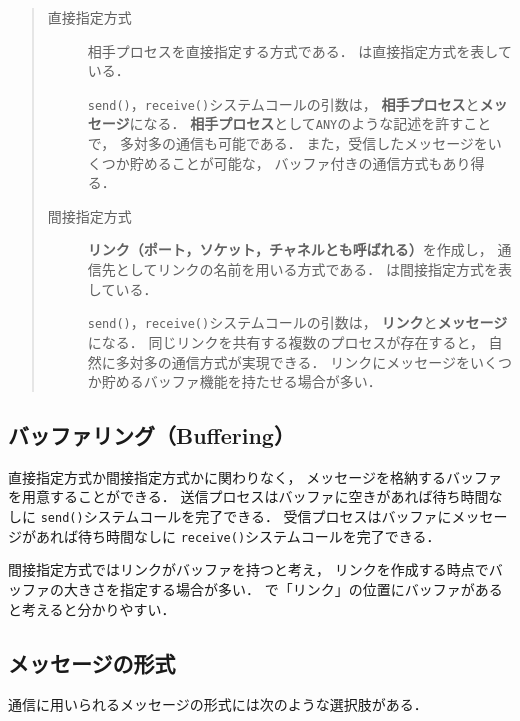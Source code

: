 \begin{quote}
\begin{description}
\item[直接指定方式]
相手プロセスを直接指定する方式である．
は直接指定方式を表している．


{\tt send()}，{\tt receive()}システムコールの引数は，
{\bf 相手プロセス}と{\bf メッセージ}になる．
{\bf 相手プロセス}として{\tt ANY}のような記述を許すことで，
多対多の通信も可能である．
また，受信したメッセージをいくつか貯めることが可能な，
バッファ付きの通信方式もあり得る．

\item[間接指定方式]
{\bf リンク（ポート，ソケット，チャネルとも呼ばれる）}を作成し，
通信先としてリンクの名前を用いる方式である．
は間接指定方式を表している．


{\tt send()}，{\tt receive()}システムコールの引数は，
{\bf リンク}と{\bf メッセージ}になる．
同じリンクを共有する複数のプロセスが存在すると，
自然に多対多の通信方式が実現できる．
リンクにメッセージをいくつか貯めるバッファ機能を持たせる場合が多い．
\end{description}
\end{quote}

\subsection{バッファリング（Buffering）}
直接指定方式か間接指定方式かに関わりなく，
メッセージを格納するバッファを用意することができる．
送信プロセスはバッファに空きがあれば待ち時間なしに
{\tt send()}システムコールを完了できる．
受信プロセスはバッファにメッセージがあれば待ち時間なしに
{\tt receive()}システムコールを完了できる．

間接指定方式ではリンクがバッファを持つと考え，
リンクを作成する時点でバッファの大きさを指定する場合が多い．
で「リンク」の位置にバッファがあると考えると分かりやすい．

\subsection{メッセージの形式}
通信に用いられるメッセージの形式には次のような選択肢がある．

